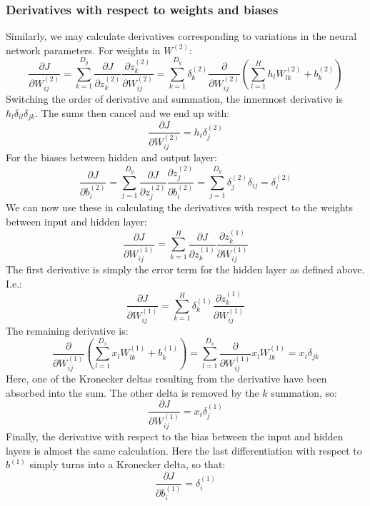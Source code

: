 \documentclass[12pt, a4paper]{article}
\numberwithin{equation}{section}
\begin{document}
\subsubsection{Derivatives with respect to weights and biases}
Similarly, we may calculate derivatives corresponding to variations in the neural network parameters. For weights in $W^{(2)}$:
\begin{equation}
\frac{\partial J}{\partial W^{(2)}_{ij}}=\sum_{k=1}^{D_y}\frac{\partial J}{\partial z^{(2)}_k}\frac{\partial z^{(2)}_k}{\partial W^{(2)}_{ij}}=\sum_{k=1}^{D_y}\delta^{(2)}_k\frac{\partial}{\partial W^{(2)}_{ij}}\left(\sum_{l=1}^H h_l W^{(2)}_{lk}+b^{(2)}_k\right)
\end{equation}
Switching the order of derivative and summation, the innermost derivative is $h_l\delta_{il}\delta_{jk}$. The sums then cancel and we end up with:
\begin{equation}
\frac{\partial J}{\partial W^{(2)}_{ij}}=h_i\delta^{(2)}_j
\end{equation}
For the biases between hidden and output layer:
\begin{equation}
\frac{\partial J}{\partial b^{(2)}_i}=\sum_{j=1}^{D_y}\frac{\partial J}{\partial z^{(2)}_j}\frac{\partial z^{(2)}_j}{\partial b^{(2)}_i}=\sum_{j=1}^{D_y}\delta^{(2)}_j\delta_{ij}=\delta^{(2)}_i
\end{equation}
We can now use these in calculating the derivatives with respect to the weights between input and hidden layer:
\begin{equation}
\frac{\partial J}{\partial W^{(1)}_{ij}}=\sum_{k=1}^H\frac{\partial J}{\partial z^{(1)}_k}\frac{\partial z^{(1)}_k}{\partial W^{(1)}_{ij}}
\end{equation}
The first derivative is simply the error term for the hidden layer as defined above. I.e.:
\begin{equation}
\frac{\partial J}{\partial W^{(1)}_{ij}}=\sum_{k=1}^H\delta^{(1)}_k\frac{\partial z^{(1)}_k}{\partial W^{(1)}_{ij}}
\end{equation}
The remaining derivative is:
\begin{equation}
\frac{\partial}{\partial W^{(1)}_{ij}}\left(\sum_{l=1}^{D_x}x_l W^{(1)}_{lk}+b^{(1)}_k\right)=\sum_{l=1}^{D_x}\frac{\partial}{\partial W^{(1)}_{ij}}x_l W^{(1)}_{lk}=x_i\delta_{jk}
\end{equation}
Here, one of the Kronecker deltas resulting from the derivative have been absorbed into the sum. The other delta is removed by the $k$ summation, so:
\begin{equation}
\frac{\partial J}{\partial W^{(1)}_{ij}}=x_i\delta^{(1)}_j
\end{equation}
Finally, the derivative with respect to the bias between the input and hidden layers is almost the same calculation. Here the last differentiation with respect to $b^{(1)}$ simply turns into a Kronecker delta, so that:
\begin{equation}
\frac{\partial J}{\partial b^{(1)}_i}=\delta^{(1)}_i
\end{equation}
\end{document}
